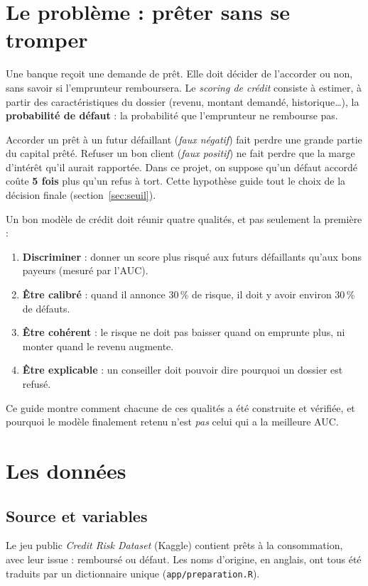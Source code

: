 \documentclass[11pt,a4paper]{article}
\newcommand{\code}[1]{\texttt{#1}}
\begin{document}
\section{Le problème : prêter sans se tromper}

Une banque reçoit une demande de prêt. Elle doit décider de l'accorder ou non, sans savoir si l'emprunteur remboursera. Le \emph{scoring de crédit} consiste à estimer, à partir des caractéristiques du dossier (revenu, montant demandé, historique…), la \textbf{probabilité de défaut} : la probabilité que l'emprunteur ne rembourse pas.

\begin{intuition}
Accorder un prêt à un futur défaillant (\emph{faux négatif}) fait perdre une grande partie du capital prêté. Refuser un bon client (\emph{faux positif}) ne fait perdre que la marge d'intérêt qu'il aurait rapportée. Dans ce projet, on suppose qu'un défaut accordé coûte \textbf{5 fois} plus qu'un refus à tort. Cette hypothèse guide tout le choix de la décision finale (section~\ref{sec:seuil}).
\end{intuition}

Un bon modèle de crédit doit réunir quatre qualités, et pas seulement la première :
\begin{enumerate}
\item \textbf{Discriminer} : donner un score plus risqué aux futurs défaillants qu'aux bons payeurs (mesuré par l'AUC).
\item \textbf{Être calibré} : quand il annonce 30\,\% de risque, il doit y avoir environ 30\,\% de défauts.
\item \textbf{Être cohérent} : le risque ne doit pas baisser quand on emprunte plus, ni monter quand le revenu augmente.
\item \textbf{Être explicable} : un conseiller doit pouvoir dire pourquoi un dossier est refusé.
\end{enumerate}

Ce guide montre comment chacune de ces qualités a été construite et vérifiée, et pourquoi le modèle finalement retenu n'est \emph{pas} celui qui a la meilleure AUC.

\section{Les données}

\subsection{Source et variables}
Le jeu public \emph{Credit Risk Dataset} (Kaggle) contient \nBrut{} prêts à la consommation, avec leur issue : remboursé ou défaut. Les noms d'origine, en anglais, ont tous été traduits par un dictionnaire unique (\code{app/preparation.R}).
\end{document}
